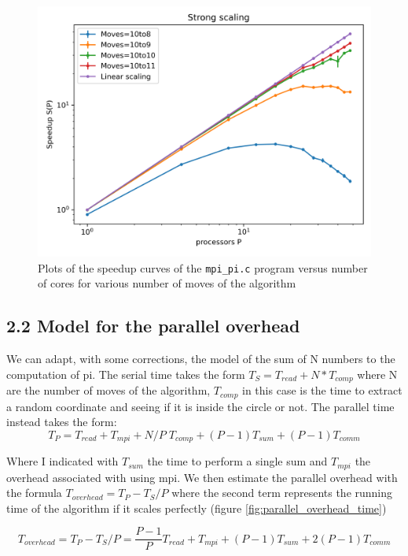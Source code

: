 \documentclass[a4paper]{article}
\begin{document}
\begin{figure}[hb!]
    \centering
    \includegraphics[scale=0.7]{strong_scaling_speedup.png}
    \caption{Plots of the speedup curves of the \texttt{mpi\_pi.c} program versus number of cores for various number of moves of the algorithm}
    \label{fig:strong_speedup}
\end{figure}


\subsection*{2.2 Model for the parallel overhead}
We can adapt, with some corrections, the model of the sum of N numbers to the computation of pi. The serial time takes the form $T_S = T_{read} + N*T_{comp}$ where N are the number of moves of the algorithm, $T_{comp}$ in this case is the time to extract a random coordinate and seeing if it is inside the circle or not. The parallel time instead takes the form:
\begin{equation*}
    T_P = T_{read} + T_{mpi} + N/P \;T_{comp} + (P-1)T_{sum} + (P-1)T_{comm}
\end{equation*}

Where I indicated with $T_{sum}$ the time to perform a single sum and $T_{mpi}$ the overhead associated with using mpi. We then estimate the parallel overhead with the formula $T_{overhead} = T_P - T_S / P$ where the second term represents the running time of the algorithm if it scales perfectly (figure \ref{fig:parallel_overhead_time})

\begin{equation*}
    T_{overhead} = T_P - T_S / P = \frac{P-1}{P} T_{read} + T_{mpi} + (P-1)T_{sum} + 2(P-1)T_{comm}
\end{equation*}
\end{document}
